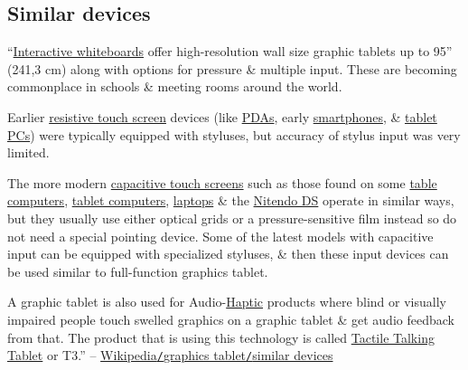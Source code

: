\documentclass[oneside]{book}
\numberwithin{equation}{section}
\begin{document}
\subsection{Similar devices}
``\href{https://en.wikipedia.org/wiki/Interactive_whiteboard}{Interactive whiteboards} offer high-resolution wall size graphic tablets up to 95'' (241,3 cm) along with options for pressure \& multiple input. These are becoming commonplace in schools \& meeting rooms around the world.

Earlier \href{https://en.wikipedia.org/wiki/Resistive_touch_screen}{resistive touch screen} devices (like \href{https://en.wikipedia.org/wiki/Personal_digital_assistant}{PDAs}, early \href{https://en.wikipedia.org/wiki/Smartphone}{smartphones}, \& \href{https://en.wikipedia.org/wiki/Tablet_PC}{tablet PCs}) were typically equipped with styluses, but accuracy of stylus input was very limited.

The more modern \href{https://en.wikipedia.org/wiki/Capacitive_touch_screen}{capacitive touch screens} such as those found on some \href{https://en.wikipedia.org/wiki/Table_computer}{table computers}, \href{https://en.wikipedia.org/wiki/Tablet_computer}{tablet computers}, \href{https://en.wikipedia.org/wiki/Laptop}{laptops} \& the \href{https://en.wikipedia.org/wiki/Nintendo_DS}{Nitendo DS} operate in similar ways, but they usually use either optical grids or a pressure-sensitive film instead so do not need a special pointing device. Some of the latest models with capacitive input can be equipped with specialized styluses, \& then these input devices can be used similar to full-function graphics tablet.

A graphic tablet is also used for Audio-\href{https://en.wikipedia.org/wiki/Haptic_technology}{Haptic} products where blind or visually impaired people touch swelled graphics on a graphic tablet \& get audio feedback from that. The product that is using this technology is called \href{https://en.wikipedia.org/wiki/Tactile_Talking_Tablet}{Tactile Talking Tablet} or T3.'' -- \href{https://en.wikipedia.org/wiki/Graphics_tablet#Similar_devices}{Wikipedia\texttt{/}graphics tablet\texttt{/}similar devices}


\begin{thebibliography}{99}
	\bibitem[]{}
\end{thebibliography}


\printbibliography[heading=bibintoc]
	
\end{document}
